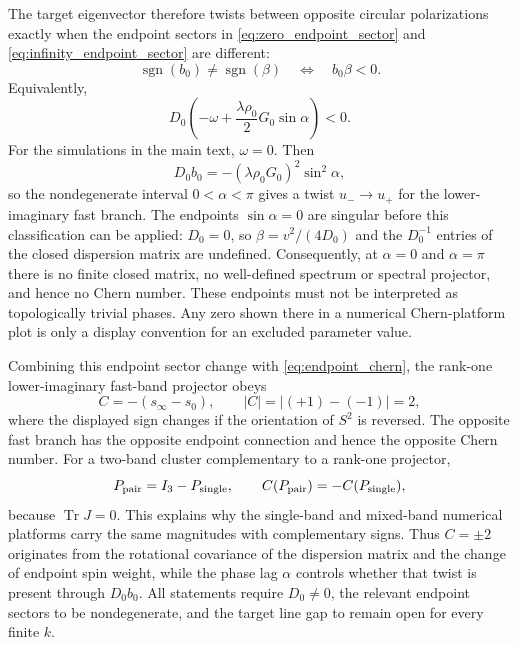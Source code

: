 \documentclass[11pt]{article}
\numberwithin{equation}{section}
\begin{document}
The target eigenvector therefore twists between opposite circular
polarizations exactly when the endpoint sectors in
\eqref{eq:zero_endpoint_sector} and \eqref{eq:infinity_endpoint_sector}
are different:
\begin{equation}
  \operatorname{sgn}(b_0)\ne\operatorname{sgn}(\beta)
  \quad\Longleftrightarrow\quad
  b_0\beta<0 .
  \label{eq:twist_condition_beta}
\end{equation}
Equivalently,
\begin{equation}
  D_0
  \left(
  -\omega+\frac{\lambda\rho_0}{2}G_0\sin\alpha
  \right)<0 .
  \label{eq:twist_condition_general}
\end{equation}
For the simulations in the main text, $\omega=0$. Then
\begin{equation}
  D_0b_0=-(\lambda\rho_0G_0)^2\sin^2\alpha ,
\end{equation}
so the nondegenerate interval $0<\alpha<\pi$ gives a twist
$u_-\to u_+$ for the lower-imaginary fast branch. The endpoints
$\sin\alpha=0$ are singular before this classification can be applied:
$D_0=0$, so $\beta=v^2/(4D_0)$ and the $D_0^{-1}$ entries of the closed
dispersion matrix are undefined. Consequently, at $\alpha=0$ and
$\alpha=\pi$ there is no finite closed matrix, no well-defined spectrum or
spectral projector, and hence no Chern number. These endpoints must not be
interpreted as topologically trivial phases. Any zero shown there in a
numerical Chern-platform plot is only a display convention for an excluded
parameter value.

Combining this endpoint sector change with \eqref{eq:endpoint_chern},
the rank-one lower-imaginary fast-band projector obeys
\begin{equation}
  C=-\left(s_\infty-s_0\right),
  \qquad
  |C|=|(+1)-(-1)|=2,
  \label{eq:fast_band_chern}
\end{equation}
where the displayed sign changes if the orientation of $S^2$ is reversed.
The opposite fast branch has the opposite endpoint connection and hence
the opposite Chern number. For a two-band cluster complementary to a
rank-one projector,
\begin{equation}
  P_{\rm pair}=I_3-P_{\rm single},
  \qquad
  C(P_{\rm pair})=-C(P_{\rm single}),
  \label{eq:complementary_cluster_chern}
\end{equation}
because $\operatorname{Tr}J=0$. This explains why the single-band and
mixed-band numerical platforms carry the same magnitudes with
complementary signs. Thus $C=\pm2$ originates from the rotational
covariance of the dispersion matrix and the change of endpoint spin
weight, while the phase lag $\alpha$ controls whether that twist is
present through $D_0b_0$. All statements require $D_0\ne0$, the relevant
endpoint sectors to be nondegenerate, and the target line gap to remain
open for every finite $k$.
\end{document}
